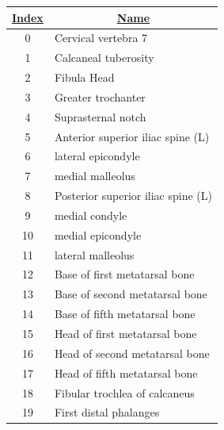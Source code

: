 \begin{table}[!h]
	\centering
	\begin{tabular}{|c|l|}
		\hline
		{\ul \textbf{Index}} & \multicolumn{1}{c|}{{\ul \textbf{Name}}} \\ \hline
		0                    & Cervical vertebra 7                      \\ \hline
		1                    & Calcaneal tuberosity                     \\ \hline
		2                    & Fibula Head                              \\ \hline
		3                    & Greater trochanter                       \\ \hline
		4                    & Suprasternal notch                       \\ \hline
		5                    & Anterior superior iliac spine (L)        \\ \hline
		6                    & lateral epicondyle                       \\ \hline
		7                    & medial malleolus                         \\ \hline
		8                    & Posterior superior iliac spine (L)       \\ \hline
		9                    & medial condyle                           \\ \hline
		10                   & medial epicondyle                        \\ \hline
		11                   & lateral malleolus                        \\ \hline
		12                   & Base of first metatarsal bone            \\ \hline
		13                   & Base of second metatarsal bone           \\ \hline
		14                   & Base of fifth metatarsal bone            \\ \hline
		15                   & Head of first metatarsal bone            \\ \hline
		16                   & Head of second metatarsal bone           \\ \hline
		17                   & Head of fifth metatarsal bone            \\ \hline
		18                   & Fibular trochlea of calcaneus            \\ \hline
		19                   & First distal phalanges                   \\ \hline

\end{tabular}
\end{table}
